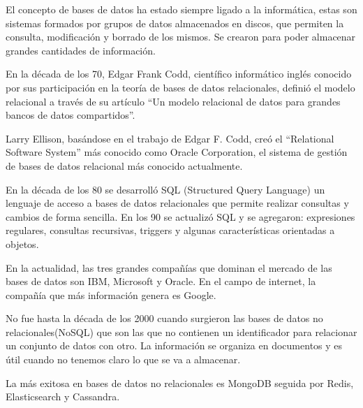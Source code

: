 \documentclass[12pt]{report} %
\begin{document}
	El concepto de bases de datos ha estado siempre ligado a la informática, estas son sistemas formados por grupos de datos almacenados en discos, que permiten la consulta, modificación y borrado de los mismos. Se crearon para poder almacenar grandes cantidades de información. 
	
	En la década de los 70, Edgar Frank Codd, científico informático inglés conocido por sus participación en la teoría de bases de datos relacionales, definió el modelo relacional  a través de su artículo “Un modelo relacional de datos para grandes bancos de datos compartidos”\cite{RelationalModel}.
	
	Larry Ellison, basándose en el trabajo de Edgar F. Codd, creó el “Relational Software System” más conocido como Oracle Corporation, el sistema de gestión de bases de datos relacional más conocido actualmente.
	
	En la década de los 80 se desarrolló SQL (Structured Query Language) un lenguaje de acceso a bases de datos relacionales que permite realizar consultas y cambios de forma sencilla. En los 90 se actualizó SQL y se agregaron: expresiones regulares, consultas recursivas, triggers y algunas características orientadas a objetos.
	
	En la actualidad, las tres grandes compañías que dominan el mercado de las bases de datos son IBM, Microsoft y Oracle. En el campo de internet, la compañía que más información genera es Google.
	
	No fue hasta la década de los 2000 cuando surgieron las bases de datos no relacionales(NoSQL) que son las que no contienen un identificador para relacionar un conjunto de datos con otro. La información se organiza en documentos y es útil cuando no tenemos claro lo que se va a almacenar.
	
	La más exitosa en bases de datos no relacionales es MongoDB seguida por Redis, Elasticsearch y Cassandra.
	
\end{document}
